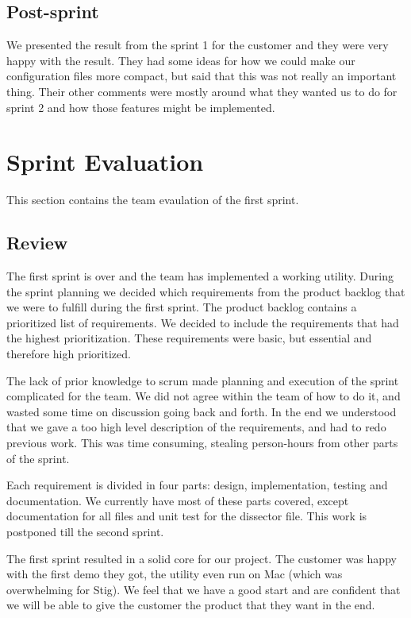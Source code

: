 \subsection{Post-sprint}
We presented the result from the sprint 1 for the customer and they were very happy with the result. They had some ideas for how we could make our configuration files more compact, but said that this was not really an important thing. Their other comments were mostly around what they wanted us to do for sprint 2 and how those features might be implemented.

\section{Sprint Evaluation}
This section contains the team evaulation of the first sprint.
\subsection{Review}
The first sprint is over and the team has implemented a working utility. During the sprint planning we decided which requirements from the product backlog that we were to fulfill during the first sprint. The product backlog contains a prioritized list of requirements. We decided to include the requirements that had the highest prioritization. These requirements were basic, but essential and therefore high prioritized.
   
The lack of prior knowledge to scrum made planning and execution of the sprint complicated for the team. We did not agree within the team of how to do it, and wasted some time on discussion going back and forth. In the end we understood that we gave a too high level description of the requirements, and had to redo previous work. This was time consuming, stealing person-hours from other parts of the sprint.

Each requirement is divided in four parts: design, implementation, testing and documentation. We currently have most of these parts covered, except documentation for all files and unit test for the dissector file. This work is postponed till the second sprint.

The first sprint resulted in a solid core for our project. The customer was happy with the first demo they got, the utility even run on Mac (which was overwhelming for Stig). We feel that we have a good start and are confident that we will be able to give the customer the product that they want in the end.

